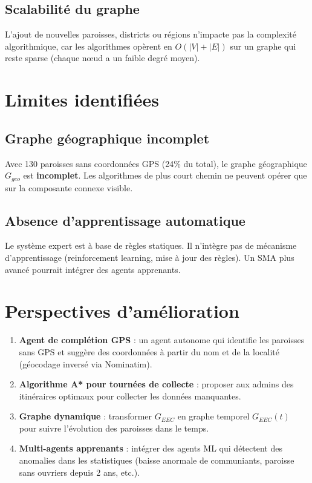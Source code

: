 \documentclass[12pt, a4paper]{report}
\theoremstyle{definition}
\begin{document}
\subsection{Scalabilité du graphe}
L'ajout de nouvelles paroisses, districts ou régions n'impacte pas la complexité algorithmique, car les algorithmes opèrent en $O(|V| + |E|)$ sur un graphe qui reste sparse (chaque nœud a un faible degré moyen).

\section{Limites identifiées}

\subsection{Graphe géographique incomplet}
Avec 130 paroisses sans coordonnées GPS (24\% du total), le graphe géographique $G_{geo}$ est \textbf{incomplet}. Les algorithmes de plus court chemin ne peuvent opérer que sur la composante connexe visible.

\subsection{Absence d'apprentissage automatique}
Le système expert est à base de règles statiques. Il n'intègre pas de mécanisme d'apprentissage (reinforcement learning, mise à jour des règles). Un SMA plus avancé pourrait intégrer des agents apprenants.

\section{Perspectives d'amélioration}

\begin{enumerate}
  \item \textbf{Agent de complétion GPS} : un agent autonome qui identifie les paroisses sans GPS et suggère des coordonnées à partir du nom et de la localité (géocodage inversé via Nominatim).

  \item \textbf{Algorithme A* pour tournées de collecte} : proposer aux admins des itinéraires optimaux pour collecter les données manquantes.

  \item \textbf{Graphe dynamique} : transformer $G_{EEC}$ en graphe temporel $G_{EEC}(t)$ pour suivre l'évolution des paroisses dans le temps.

  \item \textbf{Multi-agents apprenants} : intégrer des agents ML qui détectent des anomalies dans les statistiques (baisse anormale de communiants, paroisse sans ouvriers depuis 2 ans, etc.).
\end{enumerate}
\end{document}
